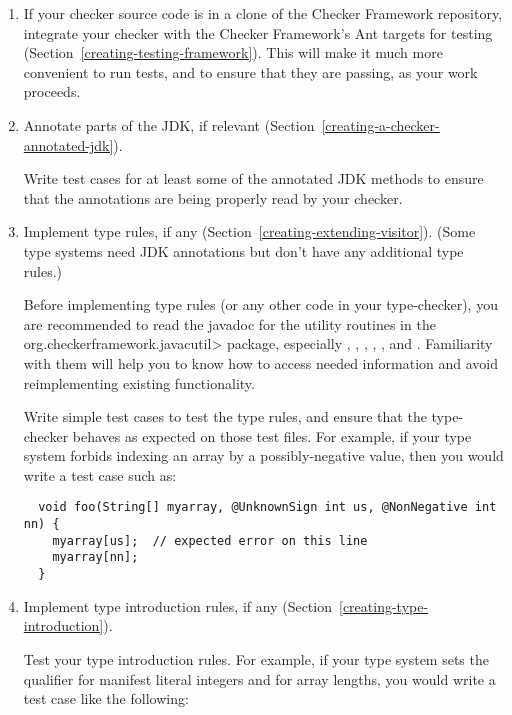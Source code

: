 \begin{enumerate}
\item
  If your checker source code is in a clone of the Checker Framework
  repository, integrate your checker with the Checker Framework's Ant
  targets for testing (Section~\ref{creating-testing-framework}).  This
  will make it much more convenient to run tests, and to ensure that they
  are passing, as your work proceeds.

\item
  Annotate parts of the JDK, if relevant
  (Section~\ref{creating-a-checker-annotated-jdk}).

  Write test cases for at least some of the annotated JDK methods to ensure
  that the annotations are being properly read by your checker.

\item
  Implement type rules, if any (Section~\ref{creating-extending-visitor}).
  (Some type systems need JDK annotations but don't have any additional
  type rules.)

  Before implementing type rules (or any other code in your type-checker),
  you are recommended to read the javadoc for the utility routines in the
  \<org.checkerframework.javacutil> package, especially
  ,
  ,
  ,
  ,
  , and
  .  Familiarity with
  them will help you to know how to access needed information and avoid
  reimplementing existing functionality.

  Write simple test cases to test the type rules, and ensure that the
  type-checker behaves as expected on those test files.
  For example, if your type system forbids indexing an array by a
  possibly-negative value, then you would write a test case such as:

\begin{Verbatim}
  void foo(String[] myarray, @UnknownSign int us, @NonNegative int nn) {
    myarray[us];  // expected error on this line
    myarray[nn];
  }
\end{Verbatim}

\item
  Implement type introduction rules, if any (Section~\ref{creating-type-introduction}).

  Test your type introduction rules.
  For example, if your type system sets the qualifier for manifest literal
  integers and for array lengths, you would write a test case like the following:


\end{enumerate}
